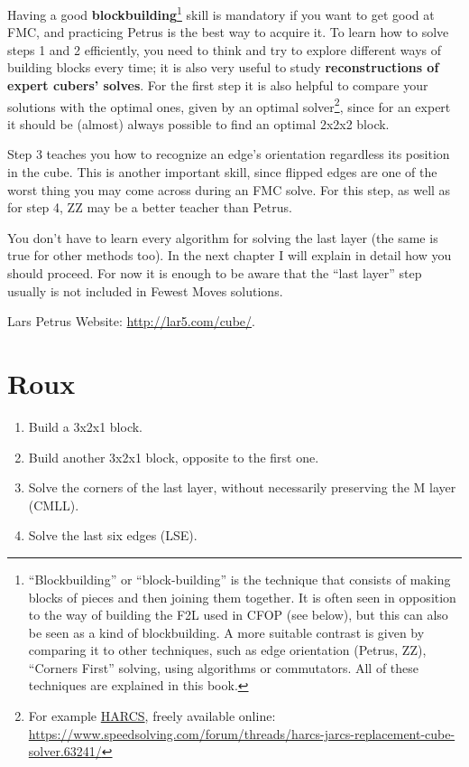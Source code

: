 \documentclass[11pt,a4paper]{book}
\begin{document}
Having a good \textbf{blockbuilding}\footnote{``Blockbuilding'' or ``block-building'' is the technique that consists of making blocks of pieces and then joining them together. It is often seen in opposition to the way of building the F2L used in CFOP (see below), but this can also be seen as a kind of blockbuilding. A more suitable contrast is given by comparing it to other techniques, such as edge orientation (Petrus, ZZ), ``Corners First'' solving, using algorithms or commutators. All of these techniques are explained in this book.} skill is mandatory if you want to get good at FMC, and practicing Petrus is the best way to acquire it. To learn how to solve steps 1 and 2 efficiently, you need to think and try to explore different ways of building blocks every time; it is also very useful to study \textbf{reconstructions of expert cubers' solves}. For the first step it is also helpful to compare your solutions with the optimal ones, given by an optimal solver\footnote{For example \href{https://www.speedsolving.com/forum/threads/harcs-jarcs-replacement-cube-solver.63241/}{HARCS}, freely available online: \url{https://www.speedsolving.com/forum/threads/harcs-jarcs-replacement-cube-solver.63241/}}, since for an expert it should be (almost) always possible to find an optimal 2x2x2 block.

Step 3 teaches you how to recognize an edge's orientation regardless its position in the cube. This is another important skill, since flipped edges are one of the worst thing you may come across during an FMC solve. For this step, as well as for step 4, ZZ may be a better teacher than Petrus.

You don't have to learn every algorithm for solving the last layer (the same is true for other methods too). In the next chapter I will explain in detail how you should proceed. For now it is enough to be aware that the ``last layer'' step usually is not included in Fewest Moves solutions.

Lars Petrus Website: \url{http://lar5.com/cube/}.

\section{Roux}

\begin{enumerate}
\item Build a 3x2x1 block.
\item Build another 3x2x1 block, opposite to the first one.
\item Solve the corners of the last layer, without necessarily preserving the M layer (CMLL).
\item Solve the last six edges (LSE).
\end{enumerate}
\end{document}

